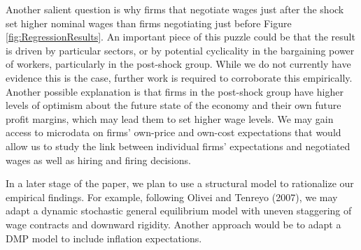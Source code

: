\documentclass[12pt]{article}
\begin{document}
	Another salient question is why firms that negotiate wages just after the shock set higher nominal wages than firms negotiating just before Figure \ref{fig:RegressionResults}. An important piece of this puzzle could be that the result is driven by particular sectors, or by potential cyclicality in the bargaining power of workers, particularly in the post-shock group. While we do not currently have evidence this is the case, further work is required to corroborate this empirically. Another possible explanation is that firms in the post-shock group have higher levels of optimism about the future state of the economy and their own future profit margins, which may lead them to set higher wage levels. We may gain access to microdata on firms' own-price and own-cost expectations that would allow us to study the link between individual firms' expectations and negotiated wages as well as hiring and firing decisions.  

	In a later stage of the paper, we plan to use a structural model to rationalize our empirical findings. For example, following Olivei and Tenreyo (2007), we may adapt a dynamic stochastic general equilibrium model with uneven staggering of wage contracts and downward rigidity. Another approach would be to adapt a DMP model to include inflation expectations. \cite{fukuiTheoryWageRigidity2020}
\end{document}
